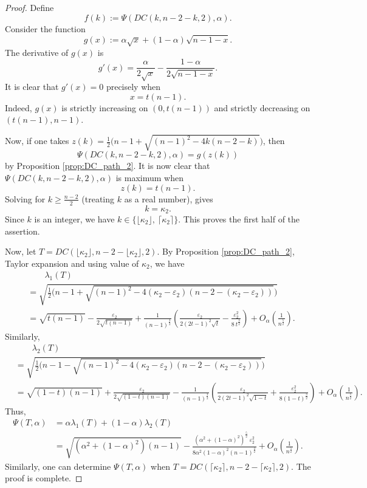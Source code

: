 \documentclass[11pt]{article}
\theoremstyle{plain}
\numberwithin{equation}{section}
\begin{document}
\begin{proof}
Define 
\[f(k) := \Psi(DC(k,n-2-k,2), \alpha).\]
Consider the function
\[ g(x):= \alpha\sqrt{x} + (1-\alpha)\sqrt{n-1-x}.\]
The derivative of $g(x)$ is
\[ g'(x)=\frac{\alpha}{2\sqrt{x}}-\frac{1-\alpha}{2\sqrt{n-1-x}}.\]
It is clear that $g'(x)=0$ precisely when 
\[ x = t(n-1).\]
Indeed, $g(x)$ is strictly increasing on $(0,t(n-1))$ and strictly decreasing on $(t(n-1), n-1)$.

Now, if one takes $z(k) = \frac{1}{2}\big(n-1+\sqrt{(n-1)^2 - 4k(n-2-k)} \big)$, then 
\[ \Psi(DC(k,n-2-k,2), \alpha) = g(z(k))\]
by Proposition \ref{prop:DC_path_2}. It is now clear that $\Psi(DC(k,n-2-k,2), \alpha)$ is maximum when 
\[ z(k) = t(n-1).\]
Solving for $k\ge \frac{n-2}{2}$ (treating $k$ as a real number), gives
\[ k = \kappa_2.\]
Since $k$ is an integer, we have $k\in \{\lfloor\kappa_2\rfloor, \ \lceil \kappa_2\rceil\}$. This proves the first half of the assertion.

Now, let $T = DC(\lfloor\kappa_2\rfloor, n-2-\lfloor\kappa_2\rfloor, 2)$. By Proposition \ref{prop:DC_path_2}, Taylor expansion and using value of $\kappa_2$, we have 
\begin{align*}
   & \qquad \lambda_1(T) \\
   & = \sqrt{ \frac{1}{2}\big(n-1+\sqrt{(n-1)^2 - 4(\kappa_2 -\varepsilon_2)(n-2-(\kappa_2-\varepsilon_2))} \big)} \\
   & = \sqrt{t(n-1)} - \frac{\varepsilon_2}{2\sqrt{t(n-1)}}+\frac{1}{(n-1)^{\frac{3}{2}}}\left(\frac{\varepsilon_2}{2(2t-1)^2\sqrt{t}}-\frac{\varepsilon_2^2}{8\ t^{\frac{3}{2}}}\right) + O_\alpha\left(\frac{1}{n^{\frac{5}{2}}}\right).
\end{align*}
Similarly, 
\begin{align*}
  & \qquad \lambda_2(T) \\
  & = \sqrt{ \frac{1}{2}\big(n-1 - \sqrt{(n-1)^2 - 4(\kappa_2 -\varepsilon_2)(n-2-(\kappa_2-\varepsilon_2))} \big)} \\
   & = \sqrt{(1-t)(n-1)} + \frac{\varepsilon_2}{2\sqrt{(1-t)(n-1)}}-\frac{1}{(n-1)^{\frac{3}{2}}}\left(\frac{\varepsilon_2}{2(2t-1)^2\sqrt{1-t}}+\frac{\varepsilon_2^2}{8(1-t)^{\frac{3}{2}}}\right) + O_\alpha\left(\frac{1}{n^{\frac{5}{2}}}\right).
\end{align*}
Thus, 
\begin{align*}
  \Psi(T, \alpha) & = \alpha \lambda_1(T) + (1-\alpha)\lambda_2(T) \\
  & = \sqrt{(\alpha^2+(1-\alpha)^2)(n-1)}-\frac{(\alpha^2 + (1-\alpha)^2)^{\frac{5}{2}}\ \varepsilon_2^2}{8\alpha^2(1-\alpha)^2(n-1)^{\frac{3}{2}}} + O_\alpha\left(\frac{1}{n^{\frac{5}{2}}}\right). 
\end{align*}
Similarly, one can determine $\Psi(T, \alpha)$ when $T = DC(\lceil\kappa_2\rceil, n-2-\lceil\kappa_2\rceil, 2)$. The proof is complete.
\end{proof}
\end{document}
